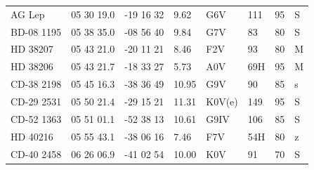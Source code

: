 \documentclass[11pt,twoside]{book}
\begin{document}
\begin{table}[]
{\begin{tabular}{lcclllr@{\hskip7pt}l}
AG Lep   &05 30 19.0&  -19 16 32& \hspace{2mm}9.62&G6V&111&95&S\\
BD-08 1195   &05 38 35.0&  -08 56 40&    \hspace{2mm}9.84 &  G7V&  \hspace{2mm}83 &80 &S\\
HD 38207   & 05 43 21.0& -20 11 21&             \hspace{2mm}8.46 &F2V&\hspace{2mm}93&80&M\\
HD 38206   &  05 43 21.7& -18 33 27&    \hspace{2mm}5.73 &  A0V&\hspace{2mm}69H&95&M\\
CD-38 2198  &05 45 16.3&    -38 36 49&       10.95&       G9V    &\hspace{2mm}90&85&s\\
CD-29 2531  &05 50 21.4&    -29 15 21&      11.31&      K0V(e)    & 149&95&S\\
CD-52 1363 &05 51 01.1&    -52 38 13&       10.61&      G9IV     & 106&85&S\\
HD 40216    &05 55 43.1&    -38 06 16&     \hspace{2mm}7.46 &      F7V  &\hspace{2mm}54H&80&z\\
CD-40 2458  &06 26 06.9&    -41 02 54&     10.00  &         K0V  &\hspace{2mm}91&70&S\\

\end{tabular}}
\end{table}
\end{document}
